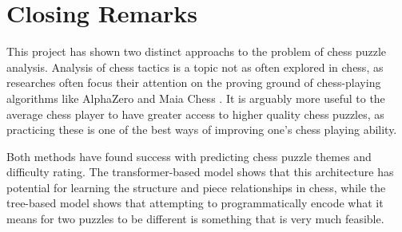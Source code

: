 \section{Closing Remarks}\label{concS3}

This project has shown two distinct approachs to the problem of chess puzzle
analysis. Analysis of chess tactics is a topic not as often explored in chess,
as researches often focus their attention on the proving ground of
chess-playing algorithms like AlphaZero \citep{silver2018general} and Maia
Chess \citep{mcilroy2020aligning}. It is arguably more useful to the average
chess player to have greater access to higher quality chess puzzles, as
practicing these is one of the best ways of improving one's chess playing
ability.

Both methods have found success with predicting chess puzzle themes and
difficulty rating. The transformer-based model shows that this architecture has
potential for learning the structure and piece relationships in chess, while
the tree-based model shows that attempting to programmatically encode what it
means for two puzzles to be different is something that is very much feasible.

